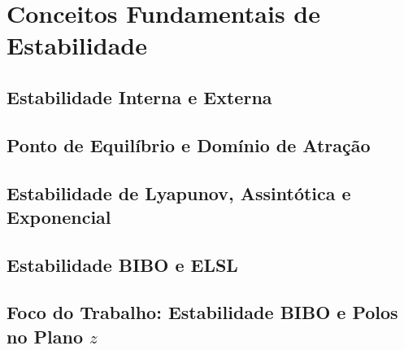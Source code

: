 \chapter{Conceitos Fundamentais de Estabilidade}
\label{cap:conceitos}

\section{Estabilidade Interna e Externa}


\section{Ponto de Equilíbrio e Domínio de Atração}


\section{Estabilidade de Lyapunov, Assintótica e Exponencial}


\section{Estabilidade BIBO e ELSL}


\section{Foco do Trabalho: Estabilidade BIBO e Polos no Plano \texorpdfstring{$z$}{z}}

